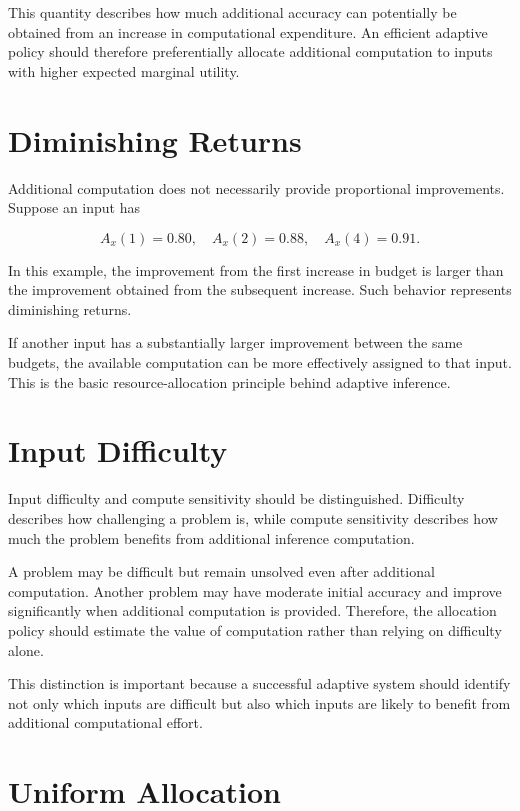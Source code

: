 \documentclass[12pt,a4paper,titlepage]{report}
\begin{document}
This quantity describes how much additional accuracy can potentially be obtained from an increase in computational expenditure. An efficient adaptive policy should therefore preferentially allocate additional computation to inputs with higher expected marginal utility.

\section{Diminishing Returns}

Additional computation does not necessarily provide proportional improvements. Suppose an input has

\begin{equation}
A_x(1)=0.80,\quad
A_x(2)=0.88,\quad
A_x(4)=0.91.
\end{equation}

In this example, the improvement from the first increase in budget is larger than the improvement obtained from the subsequent increase. Such behavior represents diminishing returns.

If another input has a substantially larger improvement between the same budgets, the available computation can be more effectively assigned to that input. This is the basic resource-allocation principle behind adaptive inference.

\section{Input Difficulty}

Input difficulty and compute sensitivity should be distinguished. Difficulty describes how challenging a problem is, while compute sensitivity describes how much the problem benefits from additional inference computation.

A problem may be difficult but remain unsolved even after additional computation. Another problem may have moderate initial accuracy and improve significantly when additional computation is provided. Therefore, the allocation policy should estimate the value of computation rather than relying on difficulty alone.

This distinction is important because a successful adaptive system should identify not only which inputs are difficult but also which inputs are likely to benefit from additional computational effort.

\section{Uniform Allocation}
\end{document}

